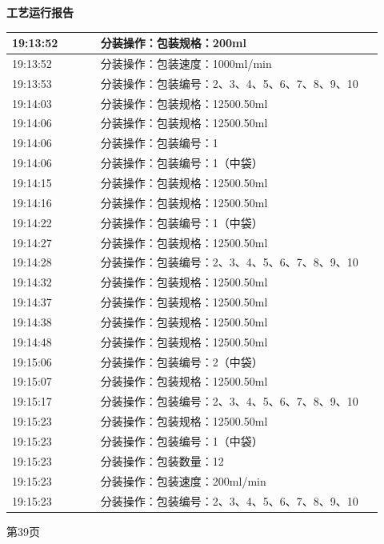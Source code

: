 \documentclass[UTF8,10pt,a4paper,fontset=fandol]{ctexart}
\begin{document}
\noindent
\begin{minipage}[t]{0.47\linewidth}
\centering
\textbf{工艺运行报告}

\smallskip
\begin{tabular}{|p{0.22\linewidth}|p{0.70\linewidth}|}
\hline
19:13:52 & 分装操作：包装规格：200ml \\ \hline
19:13:52 & 分装操作：包装速度：1000ml/min \\ \hline
19:13:53 & 分装操作：包装编号：2、3、4、5、6、7、8、9、10 \\ \hline
19:14:03 & 分装操作：包装规格：12500.50ml \\ \hline
19:14:06 & 分装操作：包装规格：12500.50ml \\ \hline
19:14:06 & 分装操作：包装编号：1 \\ \hline
19:14:06 & 分装操作：包装编号：1（中袋） \\ \hline
19:14:15 & 分装操作：包装规格：12500.50ml \\ \hline
19:14:16 & 分装操作：包装规格：12500.50ml \\ \hline
19:14:22 & 分装操作：包装编号：1（中袋） \\ \hline
19:14:27 & 分装操作：包装规格：12500.50ml \\ \hline
19:14:28 & 分装操作：包装编号：2、3、4、5、6、7、8、9、10 \\ \hline
19:14:32 & 分装操作：包装规格：12500.50ml \\ \hline
19:14:37 & 分装操作：包装规格：12500.50ml \\ \hline
19:14:38 & 分装操作：包装规格：12500.50ml \\ \hline
19:14:48 & 分装操作：包装规格：12500.50ml \\ \hline
19:15:06 & 分装操作：包装编号：2（中袋） \\ \hline
19:15:07 & 分装操作：包装规格：12500.50ml \\ \hline
19:15:17 & 分装操作：包装编号：2、3、4、5、6、7、8、9、10 \\ \hline
19:15:23 & 分装操作：包装规格：12500.50ml \\ \hline
19:15:23 & 分装操作：包装编号：1（中袋） \\ \hline
19:15:23 & 分装操作：包装数量：12 \\ \hline
19:15:23 & 分装操作：包装速度：200ml/min \\ \hline
19:15:23 & 分装操作：包装编号：2、3、4、5、6、7、8、9、10 \\ \hline
\end{tabular}

\smallskip
第39页
\end{minipage}
\end{document}
